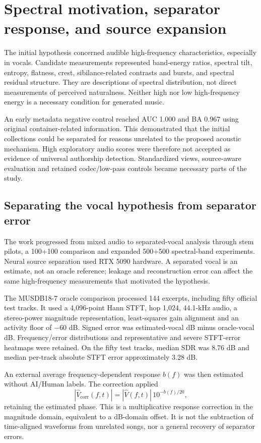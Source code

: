 \section{Spectral motivation, separator response, and source expansion}
\label{sec:final-spectral-history}

The initial hypothesis concerned audible high-frequency characteristics,
especially in vocals. Candidate measurements represented band-energy ratios,
spectral tilt, entropy, flatness, crest, sibilance-related contrasts and bursts,
and spectral residual structure. They are descriptions of spectral
distribution, not direct measurements of perceived naturalness. Neither high
nor low high-frequency energy is a necessary condition for generated music.

An early metadata negative control reached AUC 1.000 and BA 0.967 using
original container-related information. This demonstrated that the initial
collections could be separated for reasons unrelated to the proposed acoustic
mechanism. High exploratory audio scores were therefore not accepted as
evidence of universal authorship detection. Standardized views, source-aware
evaluation and retained codec/low-pass controls became necessary parts of the
study.

\subsection{Separating the vocal hypothesis from separator error}

The work progressed from mixed audio to separated-vocal analysis through stem
pilots, a 100+100 comparison and expanded 500+500 spectral-band experiments.
Neural source separation used RTX 5090 hardware. A separated vocal is an
estimate, not an oracle reference; leakage and reconstruction error can affect
the same high-frequency measurements that motivated the hypothesis.

The MUSDB18-7 oracle comparison processed 144 excerpts, including fifty
official test tracks. It used a 4,096-point Hann STFT, hop 1,024, 44.1-kHz
audio, a stereo-power magnitude representation, least-squares gain alignment
and an activity floor of $-60$ dB. Signed error was estimated-vocal dB minus
oracle-vocal dB. Frequency/error distributions and representative and severe
STFT-error heatmaps were retained. On the fifty test tracks, median SDR was
8.76 dB and median per-track absolute STFT error approximately 3.28 dB.

An external average frequency-dependent response $b(f)$ was then estimated
without AI/Human labels. The correction applied
\[
 |\widehat V_{\mathrm{corr}}(f,t)|
 = |\widehat V(f,t)|\,10^{-b(f)/20},
\]
retaining the estimated phase. This is a multiplicative response correction
in the magnitude domain, equivalent to a dB-domain offset. It is not the
subtraction of time-aligned waveforms from unrelated songs, nor a general
recovery of separator errors.

